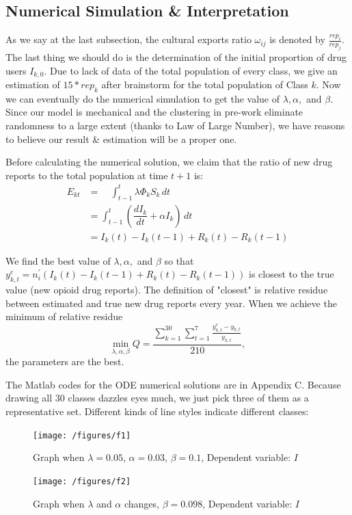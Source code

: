 \documentclass{mcmthesis}
\begin{document}
\subsection{Numerical Simulation \& Interpretation}

As we say at the last subsection, the cultural exports ratio $\omega_{ij}$ is denoted by $\frac{rep_i}{rep_j}$. The last thing we should do is the determination of the initial proportion of drug users $I_{k,0}$. Due to lack of data of the total population of every class, we give an estimation of $15*rep_k$ after brainstorm for the total population of Class $k$. Now we can eventually do the numerical simulation to get the value of $\lambda,\alpha,$ and $\beta$. Since our model is mechanical and the clustering in pre-work eliminate randomness to a large extent (thanks to Law of Large Number), we have reasons to believe our result \& estimation will be a proper one.

Before calculating the numerical solution, we claim that the ratio of new drug reports to the total population at time $t+1$ is:
\begin{equation}
 	\begin{aligned}
 		E_{kt}&=\quad \int_{t-1}^{t} \lambda \Phi_k S_k\, dt\\
 		&=\int_{t-1}^{t} (\dfrac{dI_k}{dt}+\alpha I_k)\, dt\\
 		&=I_k(t)-I_k(t-1)+R_k(t)-R_k(t-1)
 	\end{aligned}
 \end{equation}

We find the best value of $\lambda,\alpha,$ and $\beta$ so that $y^e_{k,t}=n^{'}_{i}(I_k(t)-I_k(t-1)+R_k(t)-R_k(t-1))$ is closest to the true value (new opioid drug reports). The definition of "closest" is relative residue between estimated and true new drug reports every year. When we achieve the minimum of relative residue 
$$\min \limits_{\lambda, \alpha, \beta} Q=\dfrac{\sum_{k=1}^{30}\sum_{t=1}^{7}\frac{y^e_{k,t}-y_{k,t}}{y_{k,t}}}{210},$$
the parameters are the best.

The Matlab codes for the ODE numerical solutions are in Appendix C. Because drawing all 30 classes dazzles eyes much, we just pick three of them as a representative set. Different kinds of line styles indicate different classes:
\newpage
\begin{figure}[htbp!]
  \begin{flushleft}
  	\begin{minipage}[t]{0.3\textwidth}
  \centering
  \texttt{[image: /figures/f1]}
  \caption{Graph when $\lambda=0.05$, $\alpha=0.03$, $\beta=0.1$, Dependent variable: $I$}
  \end{minipage}
  \qquad\qquad\qquad\qquad
  	\begin{minipage}[t]{0.3\textwidth}
  \centering
  \texttt{[image: /figures/f2]}
  \caption{Graph when $\lambda$ and $\alpha$ changes, $\beta=0.098$, Dependent variable: $I$}
  \end{minipage}
  \end{flushleft}
  
\end{figure}
\end{document}
